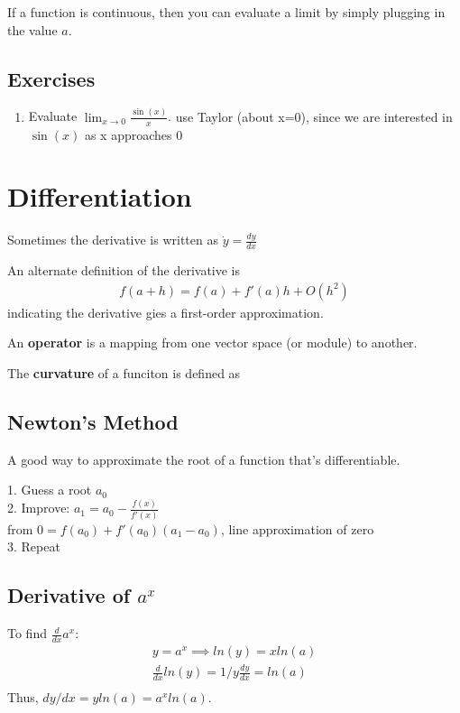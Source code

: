 \documentclass[a4paper, 12pt]{article}
\newcommand{\bt}[1]{\textbf{#1}} %
\newcommand{\eq}[1]{\begin{align*}#1\end{align*}} %
\newcommand{\bp}[1]{\fbox{\parbox{0.8\textwidth}{#1}}} %
\renewcommand{\eq}[1]{\begin{align*}#1\end{align*}} %
\newcommand{\green}[1]{\textcolor{javagreen}{#1}} %
\newcommand{\gray}[1]{\textcolor[gray]{0.5}{#1}} %
\newcommand{\tab}{\phantom{ssss}}
\begin{document}
If a function is continuous, then you can evaluate a limit by simply plugging in the value $a$.

\subsection*{\green{Exercises}}

\begin{enumerate}
    \item Evaluate $\displaystyle \lim_{x \rightarrow 0} \frac{\sin(x)}{x}$.
    \gray{
    use Taylor (about x=0), since we are interested in $\sin(x)$ as x approaches 0
    }
\end{enumerate}

\section{Differentiation}

Sometimes the derivative is written as $\dot y = \frac{dy}{dx}$

An alternate definition of the derivative is 
\eq{
f(a+h) = f(a) + f'(a)h + O(h^2)
}
indicating the derivative gies a first-order approximation.

An \bt{operator} is a mapping from one vector space (or module) to another.


The \bt{curvature} of a funciton is defined as \\
\bp{
\eq{
\frac{f''}{(1 + (f')^2)^{3/2}}
}
}

\subsection*{Newton's Method}
A good way to approximate the root of a function that's differentiable.

1. Guess a root $a_0$ \\
2. Improve: $a_1 = a_0 - \frac{f(x)}{f'(x)}$ \\
\tab \gray{from $0 = f(a_0) + f'(a_0)(a_1 -a_0)$, line approximation of zero} \\
3. Repeat

\subsection*{Derivative of $a^x$}

To find $\frac{d}{dx} a^x$: 
\eq{
y = a^x \implies ln(y) = x ln(a) \\
\frac{d}{dx} ln(y) = 1/y \frac{dy}{dx} = ln(a) \\
}
Thus, $dy/dx = y ln(a) = a^x ln(a).$
\end{document}
